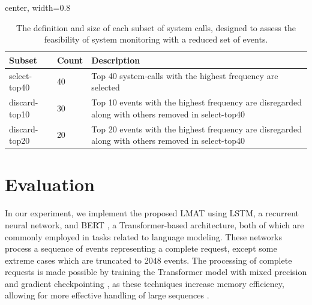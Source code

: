 \documentclass[preprint,12pt]{elsarticle}
\begin{document}
\begin{table}[tb]
\caption{The definition and size of each subset of system calls, designed to assess the feasibility of system monitoring with a reduced set of events.}
\label{tab:subset_syscalls}
\centering
\renewcommand{\arraystretch}{1.3}
\begin{adjustbox}{center, width=0.8\textwidth}
\begin{tabular}{p{2.5cm}p{1cm}p{9cm}}  %
\hline \hline
Subset         & Count & Description                                                                                                                 \\ \hline
select-top40   & 40    & Top 40 system-calls with the highest frequency are selected                                                                                    \\
discard-top10   & 30    & Top 10 events with the highest frequency are disregarded along with others removed in select-top40                                            \\
discard-top20   & 20    & Top 20 events with the highest frequency are disregarded along with others removed in select-top40                                            \\ \hline\hline
\end{tabular}
\end{adjustbox}
\end{table}



\section{Evaluation}\label{results}

In our experiment, we implement the proposed LMAT using LSTM, a recurrent neural network, and BERT \cite{devlin2018bert},  a Transformer-based architecture, both of which are commonly employed in tasks related to language modeling. These networks process a sequence of events representing a complete request, except some extreme cases which are truncated to 2048 events. The processing of complete requests is made possible by training the Transformer model with mixed precision \cite{micikevicius2018mixed} and gradient checkpointing \cite{chen2016training}, as these techniques increase memory efficiency, allowing for more effective handling of large sequences \cite{fournier2023language}.
\end{document}
